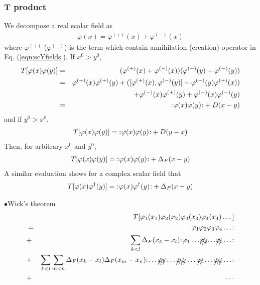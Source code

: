 \subsubsection{T product}
We decompose a real scalar field as 
\begin{eqnarray}
\varphi(x) = \varphi^{(+)}(x) + \varphi^{(-)}(x)
\end{eqnarray}
where $\varphi^{(+)}$ ($\varphi^{(-)}$) is the term which contain
annihilation (creation) operator in Eq. (\ref{eqn:scYfields}).
If $x^0 > y^0$,
\begin{eqnarray}
T[ \varphi(x) \varphi(y)]
&=& (\varphi^{(+)}(x) + \varphi^{(-)}(x))(\varphi^{(+)}(y) + \varphi^{(-)}(y))
\nonumber\\
&=&
\varphi^{(+)}(x) \varphi^{(+)}(y)
+
( [\varphi^{(+)}(x), \varphi^{(-)}(y)] 
+ \varphi^{(-)}(y) \varphi^{(+)}(x) )
\nonumber\\
&&
+
\varphi^{(-)}(x) \varphi^{(+)}(y)
+
\varphi^{(-)}(x) \varphi^{(-)}(y)
\nonumber\\
&=&
{:\mathrel{\mspace{1mu}\varphi(x) \varphi(y)\mspace{1mu}}:} + D(x-y)
\nonumber
\end{eqnarray}
and if $y^0 > x^0$,
\begin{eqnarray}
T[ \varphi(x) \varphi(y)]
=
{:\mathrel{\mspace{1mu}\varphi(x) \varphi(y)\mspace{1mu}}:} + D(y-x)
\nonumber
\end{eqnarray}
Then, for arbitrary $x^0$ and $y^0$,
\begin{eqnarray}
T[ \varphi(x) \varphi(y)]
=
{:\mathrel{\mspace{1mu}\varphi(x) \varphi(y)\mspace{1mu}}:} + \Delta_F(x-y)
\end{eqnarray}
A similar evaluation shows for a complex scalar field that
\begin{eqnarray}
T[ \varphi(x) \varphi^\dagger(y)]
=
{:\mathrel{\mspace{1mu}\varphi(x) \varphi^\dagger(y)\mspace{1mu}}:} + \Delta_F(x-y)
\end{eqnarray}

\noindent
$\bullet$Wick's theorem\\
\begin{eqnarray}
&&T[\varphi_1(x_1) \varphi_2(x_2) \varphi_3(x_3) \varphi_4(x_4) \dots]
\nonumber\\
&=& \normalprod{\varphi_1 \varphi_2 \varphi_3 \varphi_4 \dots}
\nonumber\\
&+&
\sum_{k<l} \Delta_F(x_k - x_l)
\normalprod{
{\varphi_1\dots}{\xout{\varphi_k}}{\dots}{\xout{\varphi_l}} \dots
}%
\nonumber\\
&+&
\sum_{k<l} \sum_{m<n} \Delta_F(x_k - x_l) \Delta_F(x_m - x_n)
\normalprod{\dots \xout{\varphi_k} \dots \xout{\varphi_m} \dots \xout{\varphi_l} \dots
\xout{\varphi_n} \dots}
\nonumber\\
&+& \cdots
\end{eqnarray}

